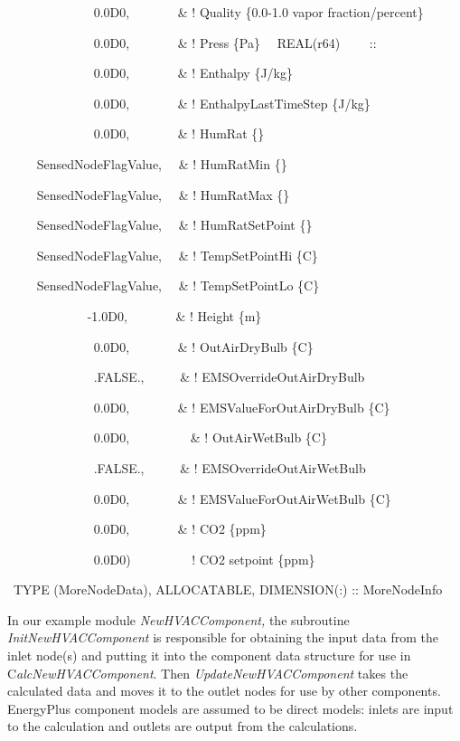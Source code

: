 ~~~~~~~~~~~~~ 0.0D0,~~~~~~~ \& ! Quality \{0.0-1.0 vapor fraction/percent\}

~~~~~~~~~~~~~ 0.0D0,~~~~~~~ \& ! Press \{Pa\}~~ REAL(r64)~~~~ ::

~~~~~~~~~~~~~ 0.0D0,~~~~~~~ \& ! Enthalpy \{J/kg\}

~~~~~~~~~~~~~ 0.0D0,~~~~~~~ \& ! EnthalpyLastTimeStep \{J/kg\}

~~~~~~~~~~~~~ 0.0D0,~~~~~~~ \& ! HumRat \{\}

~~~~ SensedNodeFlagValue,~~ \& ! HumRatMin \{\}

~~~~ SensedNodeFlagValue,~~ \& ! HumRatMax \{\}

~~~~ SensedNodeFlagValue,~~ \& ! HumRatSetPoint \{\}

~~~~ SensedNodeFlagValue,~~ \& ! TempSetPointHi \{C\}

~~~~ SensedNodeFlagValue,~~ \& ! TempSetPointLo \{C\}

~~~~~~~~~~~~ -1.0D0,~~~~~~~ \& ! Height \{m\}

~~ ~~~~~~~~~~~0.0D0,~~~~~~~ \& ! OutAirDryBulb \{C\}

~~~~~~~~~~~~~ .FALSE.,~~~~~ \& ! EMSOverrideOutAirDryBulb

~~~~~~~~~~~~~ 0.0D0,~~~~~~~ \& ! EMSValueForOutAirDryBulb \{C\}

~~~~~~~~~~~~~ 0.0D0,~~~~~~~~~ \& ! OutAirWetBulb \{C\}

~~~~~~~~~~~~~ .FALSE.,~~~~~ \& ! EMSOverrideOutAirWetBulb

~~~~~~~~~~~~~ 0.0D0,~~~~~~~ \& ! EMSValueForOutAirWetBulb \{C\}

~~~~~~~~~~~~~ 0.0D0,~~~~~~~ \& ! CO2 \{ppm\}

~~~~~~~~~~~~~ 0.0D0)~~~~~~~~~ ! CO2 setpoint \{ppm\}

~TYPE (MoreNodeData), ALLOCATABLE, DIMENSION(:) :: MoreNodeInfo

In our example module \emph{NewHVACComponent,} the subroutine \emph{InitNewHVACComponent} is responsible for obtaining the input data from the inlet node(s) and putting it into the component data structure for use in C\emph{alcNewHVACComponent}. Then \emph{UpdateNewHVACComponent} takes the calculated data and moves it to the outlet nodes for use by other components. EnergyPlus component models are assumed to be direct models: inlets are input to the calculation and outlets are output from the calculations.
